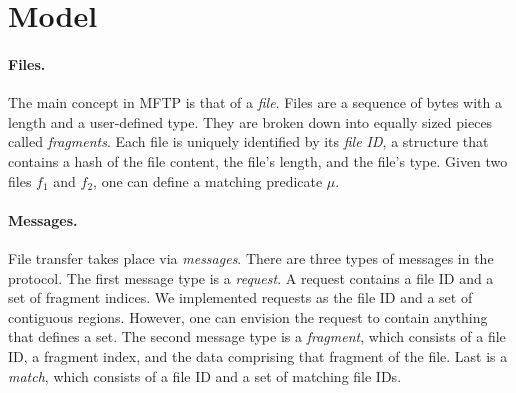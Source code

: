 \documentclass[letterpaper]{article}
\begin{document}








\pagebreak

\section{Model\label{model}}

\paragraph {Files.}
The main concept in MFTP is that of a \emph{file}.
Files are a sequence of bytes with a length and a user-defined type.
They are broken down into equally sized pieces called \emph{fragments}.  
Each file is uniquely identified by its \emph{file ID}, a structure that contains a hash of the file content, the file's length, and the file's type.
Given two files $f_1$ and $f_2$, one can define a matching predicate $\mu$.

\paragraph{Messages.}
File transfer takes place via \emph{messages}.
There are three types of messages in the protocol.
The first message type is a \emph{request}.
A request contains a file ID and a set of fragment indices.
We implemented requests as the file ID and a set of contiguous regions.  
However, one can envision the request to contain anything that defines a set.
The second message type is a \emph{fragment}, which consists of a file ID, a fragment index, and the data comprising that fragment of the file.
Last is a \emph{match}, which consists of a file ID and a set of matching file IDs.
\end{document}
